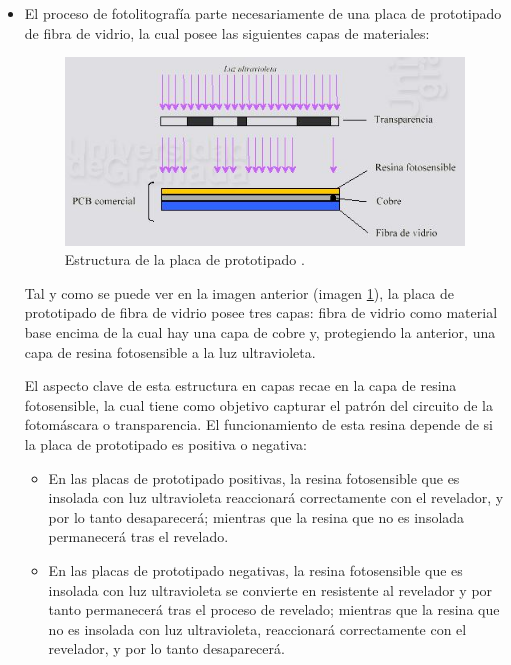 \begin{itemize}
    \item El proceso de fotolitografía parte necesariamente de una placa de prototipado de fibra de vidrio, la cual posee las siguientes capas de materiales:
    
    \begin{figure}[H]
    \centering 
    \includegraphics[width=0.9\linewidth]{pictures/Proceso1.JPG}
    \caption{Estructura de la placa de prototipado \cite{universidaddegranadaConstruccionPCB}.}
    \label{fig:Fotolitografia}
    \end{figure}
    
    Tal y como se puede ver en la imagen anterior (imagen \ref{fig:Fotolitografia}), la placa de prototipado de fibra de vidrio posee tres capas: fibra de vidrio como material base encima de la cual hay una capa de cobre y, protegiendo la anterior, una capa de resina fotosensible a la luz ultravioleta.
    
    El aspecto clave de esta estructura en capas recae en la capa de resina fotosensible, la cual tiene como objetivo capturar el patrón del circuito de la fotomáscara o transparencia. El funcionamiento de esta resina depende de si la placa de prototipado es positiva o negativa:
    \begin{itemize}
        \item En las placas de prototipado positivas, la resina fotosensible que es insolada con luz ultravioleta reaccionará correctamente con el revelador, y por lo tanto desaparecerá; mientras que la resina que no es insolada permanecerá tras el revelado.
        
        \item En las placas de prototipado negativas, la resina fotosensible que es insolada con luz ultravioleta se convierte en resistente al revelador y por tanto permanecerá tras el proceso de revelado; mientras que la resina que no es insolada con luz ultravioleta, reaccionará correctamente con el revelador, y por lo tanto desaparecerá.
    \end{itemize}
    

\end{itemize}
